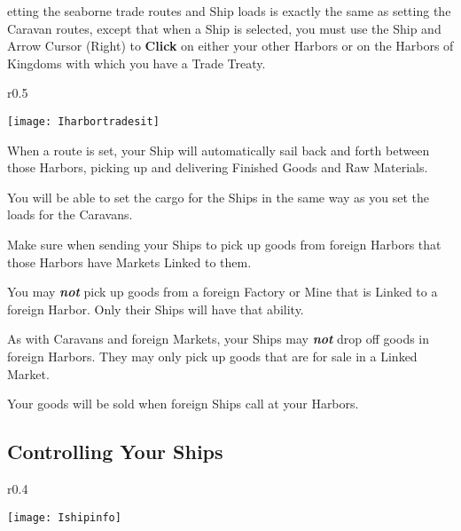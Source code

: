 etting the seaborne trade routes and Ship loads is exactly the same as setting the Caravan routes, except that when a Ship is selected, you must use the Ship and Arrow Cursor (Right) to \textbf{Click} on either your other Harbors or on the Harbors of Kingdoms with which you have a Trade Treaty.

\begin{wrapfigure}{r}{0.5\textwidth}
    \vspace{-20pt}
    \begin{center}
        \texttt{[image: Iharbortradesit]} %
    \end{center}
    \vspace{-20pt}
\end{wrapfigure}

When a route is set, your Ship will automatically sail back and forth between those Harbors, picking up and delivering Finished Goods and Raw Materials.

You will be able to set the cargo for the Ships in the same way as you set the loads for the Caravans.

Make sure when sending your Ships to pick up goods from foreign Harbors that those Harbors have Markets Linked to them.

You may \textbf{\textit{not}} pick up goods from a foreign Factory or Mine that is Linked to a foreign Harbor. Only their Ships will have that ability.

As with Caravans and foreign Markets, your Ships may \textbf{\textit{not}} drop off goods in foreign Harbors. They may only pick up goods that are for sale in a Linked Market.

Your goods will be sold when foreign Ships call at your Harbors.

\subsection{{Controlling Your Ships}}


\begin{wrapfigure}{r}{0.4\textwidth}
    \vspace{-20pt}
    \begin{center}
        \texttt{[image: Ishipinfo]} %
    \end{center}
    \vspace{-20pt}
\end{wrapfigure}

